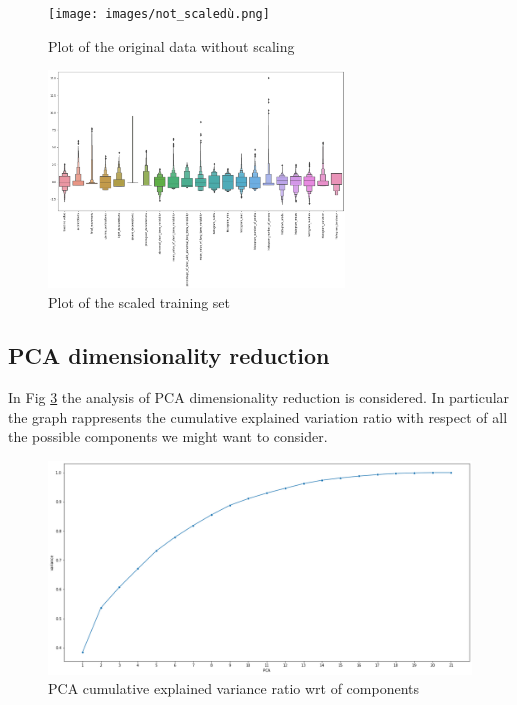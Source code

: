 \documentclass[a4paper,12pt]{article}
\begin{document}
\begin{figure}[H]
  \begin{center}
  \texttt{[image: images/not\_scaledù.png]}
  \end{center}
  \caption{Plot of the original data without scaling}
  \label{fig:notscaled}
\end{figure}
\begin{figure}[H]
  \begin{center}
  \includegraphics[width=0.7\textwidth]{images/scaled.png}
  \end{center}
  \caption{Plot of the scaled training set}
  \label{fig:scaled}
\end{figure}

\newpage
\subsection{PCA dimensionality reduction}
\bigbreak
\noindent In Fig \ref{fig:pca} the analysis of PCA dimensionality reduction is considered. In particular the graph rappresents the cumulative explained variation ratio with respect of all the possible components we might want to consider.

\begin{figure}[H]
  \begin{center}
  \includegraphics[width=1.0\textwidth]{images/pca.png}
  \end{center}
  \caption{PCA cumulative explained variance ratio wrt of components}
  \label{fig:pca}
\end{figure}
\end{document}
